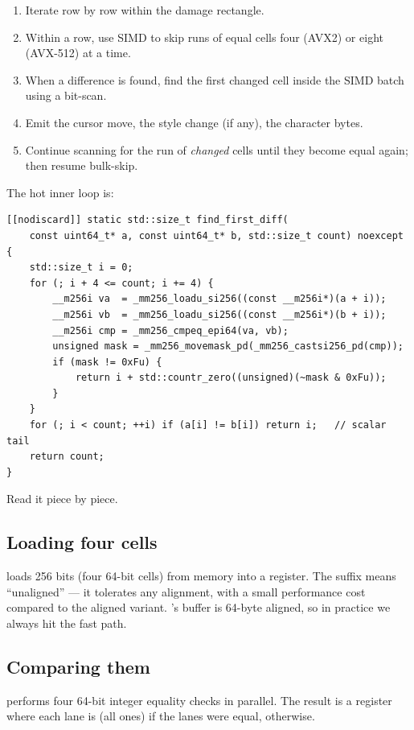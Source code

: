 \begin{enumerate}[leftmargin=*]
  \item Iterate row by row within the damage rectangle.
  \item Within a row, use SIMD to skip runs of equal cells four
    (AVX2) or eight (AVX-512) at a time.
  \item When a difference is found, find the first changed cell
    inside the SIMD batch using a bit-scan.
  \item Emit the cursor move, the style change (if any), the
    character bytes.
  \item Continue scanning for the run of \emph{changed} cells until
    they become equal again; then resume bulk-skip.
\end{enumerate}

The hot inner loop is:

\begin{lstlisting}
[[nodiscard]] static std::size_t find_first_diff(
    const uint64_t* a, const uint64_t* b, std::size_t count) noexcept
{
    std::size_t i = 0;
    for (; i + 4 <= count; i += 4) {
        __m256i va  = _mm256_loadu_si256((const __m256i*)(a + i));
        __m256i vb  = _mm256_loadu_si256((const __m256i*)(b + i));
        __m256i cmp = _mm256_cmpeq_epi64(va, vb);
        unsigned mask = _mm256_movemask_pd(_mm256_castsi256_pd(cmp));
        if (mask != 0xFu) {
            return i + std::countr_zero((unsigned)(~mask & 0xFu));
        }
    }
    for (; i < count; ++i) if (a[i] != b[i]) return i;   // scalar tail
    return count;
}
\end{lstlisting}

Read it piece by piece.

\subsection{Loading four cells}

 loads 256 bits (four 64-bit cells) from
memory into a register. The  suffix means ``unaligned'' --- it
tolerates any alignment, with a small performance cost compared to
the aligned variant. \maya{}'s buffer is 64-byte aligned, so in
practice we always hit the fast path.

\subsection{Comparing them}

 performs four 64-bit integer
equality checks in parallel. The result is a register where each
lane is  (all ones) if the lanes were equal,
 otherwise.

